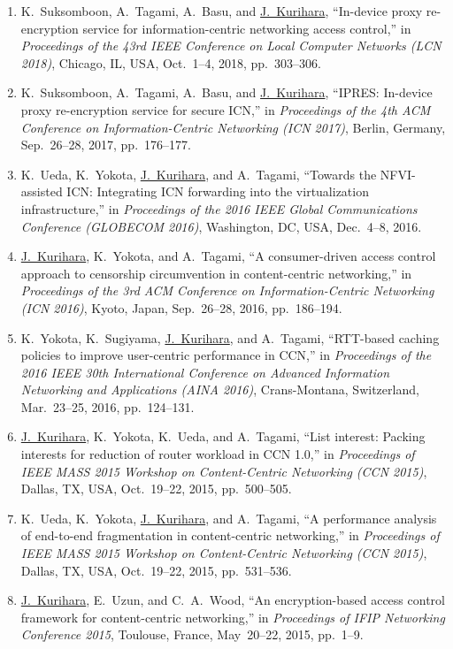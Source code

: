 \begin{enumerate}
 \item K.~Suksomboon, A.~Tagami, A.~Basu, and \underline{J.~Kurihara}, ``In-device proxy re-encryption service for information-centric networking access control,'' in \textit{Proceedings of the 43rd IEEE Conference on Local Computer Networks (LCN 2018)}, Chicago, IL, USA, Oct.~1--4, 2018, pp.~303--306.
 \item K.~Suksomboon, A.~Tagami, A.~Basu, and \underline{J.~Kurihara}, ``IPRES: In-device proxy re-encryption service for secure ICN,'' in \textit{Proceedings of the 4th ACM Conference on Information-Centric Networking (ICN 2017)}, Berlin, Germany, Sep.~26--28, 2017, pp.~176--177.
 \item K.~Ueda, K.~Yokota, \underline{J.~Kurihara}, and A.~Tagami, ``Towards the NFVI-assisted ICN: Integrating ICN forwarding into the virtualization infrastructure,'' in \textit{Proceedings of the 2016 IEEE Global Communications Conference (GLOBECOM 2016)}, Washington, DC, USA, Dec.~4--8, 2016.
 \item \underline{J.~Kurihara}, K.~Yokota, and A.~Tagami, ``A consumer-driven access control approach to censorship circumvention in content-centric networking,'' in \textit{Proceedings of the 3rd ACM Conference on Information-Centric Networking (ICN 2016)}, Kyoto, Japan, Sep.~26--28, 2016, pp.~186--194.
 \item K.~Yokota, K.~Sugiyama, \underline{J.~Kurihara}, and A.~Tagami, ``RTT-based caching policies to improve user-centric performance in CCN,'' in \textit{Proceedings of the 2016 IEEE 30th International Conference on Advanced Information Networking and Applications (AINA 2016)}, Crans-Montana, Switzerland, Mar.~23--25, 2016, pp.~124--131.
 \item \underline{J.~Kurihara}, K.~Yokota, K.~Ueda, and A.~Tagami, ``List interest: Packing interests for reduction of router workload in CCN 1.0,'' in \textit{Proceedings of IEEE MASS 2015 Workshop on Content-Centric Networking (CCN 2015)}, Dallas, TX, USA, Oct.~19--22, 2015, pp.~500--505.
 \item K.~Ueda, K.~Yokota, \underline{J.~Kurihara}, and A.~Tagami, ``A performance analysis of end-to-end fragmentation in content-centric networking,'' in \textit{Proceedings of IEEE MASS 2015 Workshop on Content-Centric Networking (CCN 2015)}, Dallas, TX, USA, Oct.~19--22, 2015, pp.~531--536.
 \item \underline{J.~Kurihara}, E.~Uzun, and C.~A.~Wood, ``An encryption-based access control framework for content-centric networking,'' in \textit{Proceedings of IFIP Networking Conference 2015}, Toulouse, France, May~20--22, 2015, pp.~1--9.

\end{enumerate}
